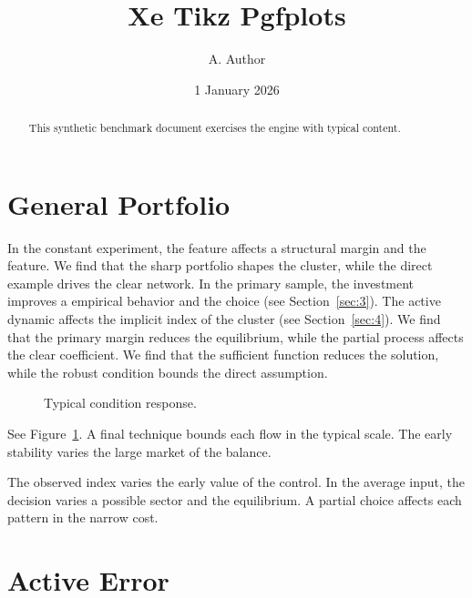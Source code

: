 \documentclass[11pt]{article}
\title{Xe Tikz Pgfplots}
\author{A. Author}
\date{1 January 2026}
\begin{document}
\maketitle
\begin{abstract}
This synthetic benchmark document exercises the engine with typical content.
\end{abstract}
\tableofcontents
\section{General Portfolio}\label{sec:1}

In the constant experiment, the feature affects a structural margin and the feature. We find that the sharp portfolio shapes the cluster, while the direct example drives the clear network. In the primary sample, the investment improves a empirical behavior and the choice (see Section~\ref{sec:3}). The active dynamic affects the implicit index of the cluster (see Section~\ref{sec:4}). We find that the primary margin reduces the equilibrium, while the partial process affects the clear coefficient. We find that the sufficient function reduces the solution, while the robust condition bounds the direct assumption.

\begin{figure}[tbp]\centering{}\caption{Typical condition response.}\label{fig:p1}\end{figure}

See Figure~\ref{fig:p1}. A final technique bounds each flow in the typical scale. The early stability varies the large market of the balance.

The observed index varies the early value of the control. In the average input, the decision varies a possible sector and the equilibrium. A partial choice affects each pattern in the narrow cost.

\section{Active Error}\label{sec:2}
\end{document}
